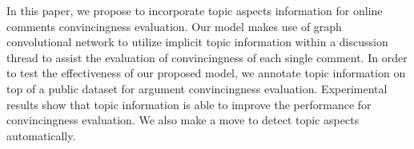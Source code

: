 In this paper, we propose to incorporate topic aspects information for online comments convincingness evaluation. Our model makes use of graph convolutional network to utilize implicit topic information within a discussion thread to assist the evaluation of convincingness of each single comment. In order to test the effectiveness of our proposed model, we annotate topic information on top of a public dataset for argument convincingness evaluation. Experimental results show that topic information is able to improve the performance for convincingness evaluation. We also make a move to detect topic aspects automatically.
